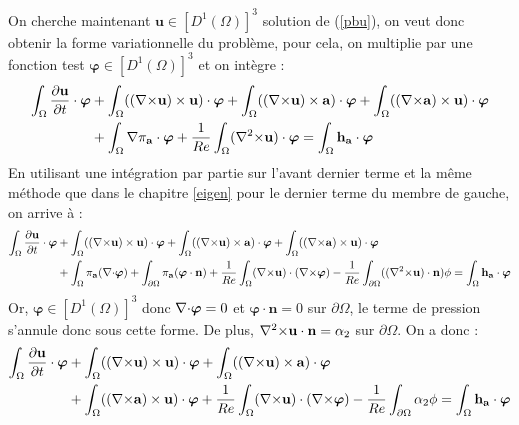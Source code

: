 On cherche maintenant $\mathbf{u}\in [D^1(\Omega)]^3$ solution de (\ref{pbu}), on veut donc obtenir la forme variationnelle du problème, pour cela, on multiplie par une fonction test $\bm{\varphi}\in [D^1(\Omega)]^3$ et on intègre :
\begin{align*}
\int_\Omega \frac{\partial \mathbf{u}}{\partial t}\cdot \bm{\varphi} &+ \int_\Omega (({\nabla\times} \mathbf{u})\times \mathbf{u})\cdot \bm{\varphi} + \int_\Omega (({\nabla\times} \mathbf{u})\times \mathbf{a})\cdot\bm{\varphi} + \int_\Omega (({\nabla\times} \mathbf{a})\times \mathbf{u})\cdot\bm{\varphi} \\
&+ \int_\Omega {\nabla}\pi_{\mathbf{a}}\cdot\bm{\varphi} + \frac{1}{Re}\int_\Omega ({\nabla^2\times} \mathbf{u})\cdot\bm{\varphi} = \int_\Omega \mathbf{h_a}\cdot\bm{\varphi}
\end{align*}
En utilisant une intégration par partie sur l'avant dernier terme et la même méthode que dans le chapitre \ref{eigen} pour le dernier terme du membre de gauche, on arrive à :
\begin{align*}
\int_\Omega \frac{\partial \mathbf{u}}{\partial t}\cdot \bm{\varphi} &+ \int_\Omega (({\nabla\times} \mathbf{u})\times \mathbf{u})\cdot \bm{\varphi} + \int_\Omega (({\nabla\times} \mathbf{u})\times \mathbf{a})\cdot\bm{\varphi} + \int_\Omega (({\nabla\times} \mathbf{a})\times \mathbf{u})\cdot\bm{\varphi}\\
&+ \int_\Omega \pi_{\mathbf{a}}({\nabla\cdot}\bm{\varphi}) + \int_{\partial \Omega} \pi_{\mathbf{a}}(\bm{\varphi}\cdot \mathbf{n}) + \frac{1}{Re}\int_\Omega ({\nabla\times} \mathbf{u})\cdot({\nabla\times}\bm{\varphi}) -\frac{1}{Re}\int_{\partial\Omega} (({\nabla^2\times} \mathbf{u})\cdot \mathbf{n})\phi = \int_\Omega \mathbf{h_a}\cdot\bm{\varphi}
\end{align*}
Or, $\bm{\varphi}\in [D^1(\Omega)]^3$ donc ${\nabla\cdot}\bm{\varphi}=0$ et $\bm{\varphi}\cdot \mathbf{n}=0$ sur $\partial\Omega$, le terme de pression s'annule donc sous cette forme. De plus, ${\nabla^2\times} \mathbf{u}\cdot \mathbf{n}=\alpha_2$ sur $\partial\Omega$. On a donc :
\begin{equation}
\label{fvu}
\begin{aligned}
\int_\Omega \frac{\partial \mathbf{u}}{\partial t}\cdot \bm{\varphi} &+ \int_\Omega (({\nabla\times} \mathbf{u})\times \mathbf{u})\cdot \bm{\varphi} + \int_\Omega (({\nabla\times} \mathbf{u})\times \mathbf{a})\cdot\bm{\varphi} \\
&+ \int_\Omega (({\nabla\times} \mathbf{a})\times \mathbf{u})\cdot\bm{\varphi} + \frac{1}{Re}\int_\Omega ({\nabla\times} \mathbf{u})\cdot({\nabla\times}\bm{\varphi}) -\frac{1}{Re}\int_{\partial\Omega} \alpha_2\phi = \int_\Omega \mathbf{h_a}\cdot\bm{\varphi}
\end{aligned}
\end{equation}

